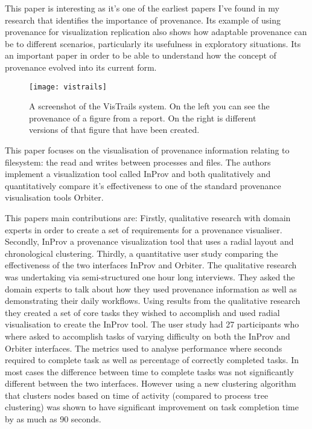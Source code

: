 This paper is interesting as it's one of the earliest papers I've found in my research that identifies the importance of provenance. Its example of using provenance for visualization replication also shows how adaptable provenance can be to different scenarios, particularly its usefulness in exploratory situations. Its an important paper in order to be able to understand how the concept of provenance evolved into its current form.

\begin{figure}[h]
	\centering
	\texttt{[image: vistrails]}
	\caption{A screenshot of the VisTrails system. On the left you can see the provenance of a figure from a report. On the right is different versions of that figure that have been created.}
	\label{fig:vistrails}
\end{figure}

This paper focuses on the visualisation of provenance information relating to filesystem: the read and writes between processes and files. The authors implement a visualization tool called InProv and both qualitatively and quantitatively compare it's effectiveness to one of the standard provenance visualisation tools Orbiter\cite{Seltzer2011}.

This papers main contributions are: Firstly, qualitative research with domain experts in order to create a set of requirements for a provenance visualiser. Secondly, InProv a provenance visualization tool that uses a radial layout and chronological clustering. Thirdly, a quantitative user study comparing the effectiveness of the two interfaces InProv and Orbiter. The qualitative research was undertaking via semi-structured one hour long interviews. They asked the domain experts to talk about how they used provenance information as well as demonstrating their daily workflows. Using results from the qualitative research they created a set of core tasks they wished to accomplish and used radial visualisation to create the InProv tool. The user study had 27 participants who where asked to accomplish tasks of varying difficulty on both the InProv and Orbiter interfaces. The metrics used to analyse performance where seconds required to complete task as well as percentage of correctly completed tasks. In most cases the difference between time to complete tasks was not significantly different between the two interfaces. However using a new clustering algorithm that clusters nodes based on time of activity (compared to process tree clustering) was shown to have significant improvement on task completion time by as much as 90 seconds.

